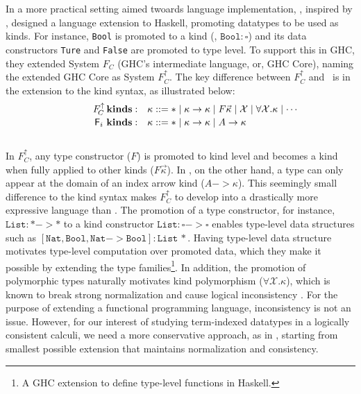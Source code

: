 In a more practical setting aimed twoards language implementation,
\citet{YorgeyWCJVM12}, inspired by \citet{SHE}, designed a language extension
to Haskell, promoting datatypes to be used as kinds. For instance, \texttt{Bool}
is promoted to a kind (\ie, $\texttt{Bool}:\square$) and its data constructors
\texttt{Ture} and \texttt{False} are promoted to type level. To support this
in GHC, they extended System $F_{\!C}$ (GHC's intermediate language, or,
GHC Core), naming the extended GHC Core as System $F_{\!C}^\uparrow$.
The key difference between $F_{\!C}^\uparrow$ and \Fi\ is in the extension
to the kind syntax, as illustrated below: \vspace*{-2pt}
\[\qquad\quad
\begin{array}{ll}
F_{\!C}^\uparrow\,\textbf{kinds}: &
\kappa ::= * \mid \kappa -> \kappa \mid F \vec{\kappa} \mid \mathcal{X} \mid \forall \mathcal{X}.\kappa \mid \cdots \\
\,\Fi\,\,\textbf{kinds}: &
\kappa ::= * \mid \kappa -> \kappa \mid A -> \kappa \phantom{A^{A^A}}
\end{array}  
\] ~\vspace*{-6pt}\\
In $F_{\!C}^\uparrow$, any type constructor ($F$) is promoted to 
kind level and becomes a kind when fully applied to other kinds
($F\vec\kappa$). In \Fi, on the other hand, a type can only appear
at the domain of an index arrow kind ($A-> \kappa$). This seemingly small
difference to the kind syntax makes $F_{\!C}^\uparrow$ to develop into
a drastically more expressive language than \Fi. The promotion of
a type constructor, for instance, $\texttt{List}:* -> *$ to a kind constructor
$\texttt{List}:\square-> \square$ enables type-level data structures
such as $\mathtt{[Nat,Bool,Nat-> Bool]:List\,*}$. Having type-level
data structure motivates type-level computation over promoted data,
which they make it possible by extending the type families\footnote{
	A GHC extension to define type-level functions in Haskell.}.
In addition, the promotion of polymorphic types naturally motivates
kind polymorphism ($\forall \mathcal{X}.\kappa$), which is known to
break strong normalization and cause logical inconsistency \cite{Girard72}.
For the purpose of extending a functional programming language,
inconsistency is not an issue. However, for our interest of studying
term-indexed datatypes in a logically consistent calculi, we need
a more conservative approach, as in \Fi, starting from smallest possible
extension that maintains normalization and consistency.

